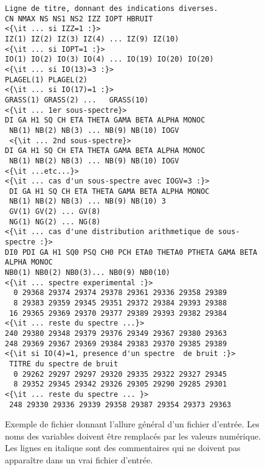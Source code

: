 \begin{figure}
\caption{\label{fig:format_fichier} 
Exemple de fichier donnant l'allure général d'un fichier d'entrée.
Les noms des variables doivent être remplacés par les valeurs numérique.
Les lignes en italique sont des commentaires qui ne doivent pas appara\^itre dans un vrai fichier d'entrée.}
\begin{lstlisting}[frame=tbl,escapeinside=<>]
Ligne de titre, donnant des indications diverses.
CN NMAX NS NS1 NS2 IZZ IOPT HBRUIT
<{\it ... si IZZ=1 :}>
IZ(1) IZ(2) IZ(3) IZ(4) ... IZ(9) IZ(10)
<{\it ... si IOPT=1 :}>
IO(1) IO(2) IO(3) IO(4) ... IO(19) IO(20) IO(20)
<{\it ... si IO(13)=3 :}>
PLAGEL(1) PLAGEL(2)
<{\it ... si IO(17)=1 :}>
GRASS(1) GRASS(2) ...   GRASS(10) 
<{\it ... 1er sous-spectre}>
DI GA H1 SQ CH ETA THETA GAMA BETA ALPHA MONOC
 NB(1) NB(2) NB(3) ... NB(9) NB(10) IOGV
 <{\it ... 2nd sous-spectre}>
DI GA H1 SQ CH ETA THETA GAMA BETA ALPHA MONOC   
 NB(1) NB(2) NB(3) ... NB(9) NB(10) IOGV
<{\it ...etc...}>
<{\it ... cas d'un sous-spectre avec IOGV=3 :}>
 DI GA H1 SQ CH ETA THETA GAMA BETA ALPHA MONOC
 NB(1) NB(2) NB(3) ... NB(9) NB(10) 3
 GV(1) GV(2) ... GV(8)
 NG(1) NG(2) ... NG(8)
<{\it ... cas d'une distribution arithmetique de sous-spectre :}>
DI0 PDI GA H1 SQ0 PSQ CH0 PCH ETA0 THETA0 PTHETA GAMA BETA ALPHA MONOC
NB0(1) NB0(2) NB0(3)... NB0(9) NB0(10)
<{\it ... spectre experimental :}>
  0 29368 29374 29374 29378 29361 29336 29358 29389
  8 29383 29359 29345 29351 29372 29384 29393 29388
 16 29365 29369 29370 29377 29389 29393 29382 29384
<{\it ... reste du spectre ...}>
240 29380 29348 29379 29376 29349 29367 29380 29363
248 29369 29367 29369 29384 29383 29370 29385 29389
<{\it si IO(4)=1, presence d'un spectre  de bruit :}>
 TITRE du spectre de bruit
  0 29262 29297 29297 29320 29335 29322 29327 29345
  8 29352 29345 29342 29326 29305 29290 29285 29301
<{\it ... reste du spectre ... }>
 248 29330 29336 29339 29358 29387 29354 29373 29363
 \end{lstlisting}
\end{figure}

\FloatBarrier
\newpage

